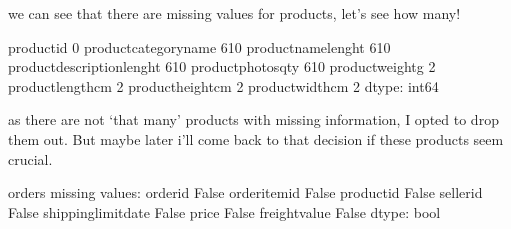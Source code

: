 \documentclass[letterpaper,10pt,english]{jupyterBook}
\begin{document}
\sphinxAtStartPar
we can see that there are missing values for products, let’s see how many!

\begin{sphinxVerbatim}[commandchars=\\\{\}]
\end{sphinxVerbatim}

\begin{sphinxVerbatim}[commandchars=\\\{\}]
product\PYGZus{}id                      0
product\PYGZus{}category\PYGZus{}name         610
product\PYGZus{}name\PYGZus{}lenght           610
product\PYGZus{}description\PYGZus{}lenght    610
product\PYGZus{}photos\PYGZus{}qty            610
product\PYGZus{}weight\PYGZus{}g                2
product\PYGZus{}length\PYGZus{}cm               2
product\PYGZus{}height\PYGZus{}cm               2
product\PYGZus{}width\PYGZus{}cm                2
dtype: int64
\end{sphinxVerbatim}

\sphinxAtStartPar
as there are not ‘that many’ products with missing information, I opted to drop them out. But maybe later i’ll come back to that decision if these products seem crucial.

\begin{sphinxVerbatim}[commandchars=\\\{\}]
  
\end{sphinxVerbatim}

\begin{sphinxVerbatim}[commandchars=\\\{\}]
\end{sphinxVerbatim}

\begin{sphinxVerbatim}[commandchars=\\\{\}]
orders missing values: 
order\PYGZus{}id               False
order\PYGZus{}item\PYGZus{}id          False
product\PYGZus{}id             False
seller\PYGZus{}id              False
shipping\PYGZus{}limit\PYGZus{}date    False
price                  False
freight\PYGZus{}value          False
dtype: bool
\end{sphinxVerbatim}
\end{document}

